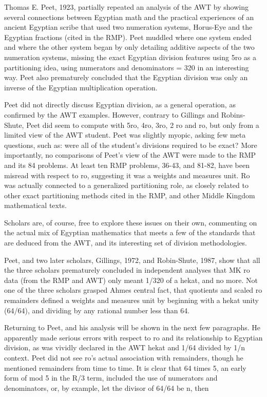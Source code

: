 \documentclass[12pt]{article}
\begin{document}
Thomas E. Peet, 1923, partially repeated an analysis of the AWT by showing several connections between Egyptian math and the practical experiences of an ancient Egyptian scribe that used two numeration systems, Horus-Eye and the Egyptian fractions (cited in the RMP). Peet muddled where one system ended and where the other system began by only detailing additive aspects of the two numeration systems, missing the exact Egyptian division features using 5ro as a partitioning idea, using numerators and denominators = 320 in an interesting way. Peet also prematurely concluded that the Egyptian division was only an inverse of the Egyptian multiplication operation.

Peet did not directly discuss Egyptian division, as a general operation, as confirmed by the AWT examples. However, contrary to Gillings and Robins-Shute, Peet did seem to compute with 5ro, 4ro, 3ro, 2 ro and ro, but only from a limited view of the AWT student. Peet was slightly myopic, asking few meta questions, such as: were all of the student's divisions required to be exact? More importantly, no comparisons of Peet's view of the AWT were made to the RMP and its 84 problems. At least ten RMP problems, 36-43, and 81-82, have been misread with respect to ro, suggesting it was a weights and measures unit. Ro was actually connected to a generalized partitioning role, as closely related to other exact partitioning methods cited in the RMP, and other Middle Kingdom mathematical texts.

Scholars are, of course, free to explore these issues on their own, commenting on the actual mix of Egyptian mathematics that meets a few of the standards that are deduced from the AWT, and its interesting set of division methodologies.

Peet, and two later scholars, Gillings, 1972, and Robin-Shute, 1987, show that all the three scholars prematurely concluded in independent analyses that MK ro data (from the RMP and AWT) only meant 1/320 of a hekat, and no more. Not one of the three scholars grasped Ahmes central fact, that quotients and scaled ro remainders defined a weights and measures unit by beginning with a hekat unity (64/64), and dividing by any rational number less than 64.

Returning to Peet, and his analysis will be shown in the next few paragraphs. He apparently made serious errors with respect to ro and its relationship to Egyptian division, as was vividly declared in the AWT hekat and 1/64 divided by 1/n context. Peet did not see ro's actual association with remainders, though he mentioned remainders from time to time. It is clear that 64 times 5, an early form of mod 5 in the R/3 term, included the use of numerators and denominators, or, by example, let the divisor of 64/64 be n, then
\end{document}

